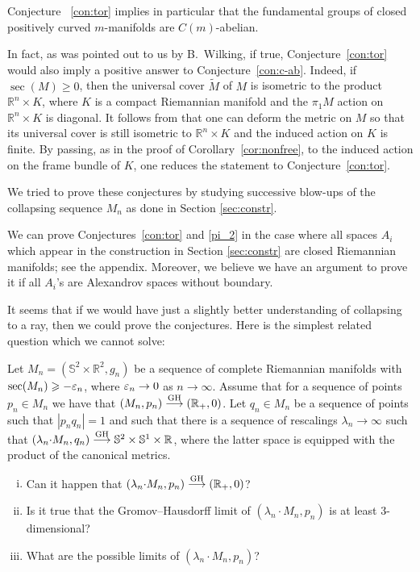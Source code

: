 \documentclass{amsart}
\begin{document}
Conjecture ~\ref{con:tor} implies in particular that the fundamental
groups of closed positively curved $m$-manifolds are $C(m)$-abelian.

In fact, as was pointed out to us by B.~Wilking, if true,
Conjecture~\ref{con:tor} would also imply a positive answer to Conjecture~\ref{con:c-ab}.
Indeed, if $\sec(M)\ge0$, then the universal cover $\tilde M$ of $M$ is isometric to the product $\mathbb{R}^n\times K$, where $K$ is a compact Riemannian manifold and the $\pi_1M$ action  on $\mathbb{R}^n\times K$ is diagonal.
It follows from \cite[Cor. 6.3]{wilking} that one can deform the metric on $M$ so that its universal cover is still isometric to $\mathbb{R}^n\times K$ and the induced action on $K$ is finite.
By passing, as in the proof of Corollary~\ref{cor:nonfree}, to the induced action on the frame bundle of $K$, one reduces the statement to Conjecture~\ref{con:tor}.

We tried to prove these conjectures by studying successive blow-ups of the
collapsing sequence $M_n$ as done in Section \ref{sec:constr}.

We can prove  Conjectures~\ref{con:tor} and \ref{pi_2} in the case where  all spaces $A_i$ which appear in the construction in  Section \ref{sec:constr} are closed Riemannian manifolds; 
see the appendix.
Moreover, we believe we have an argument to prove it if all $A_i$'s are Alexandrov spaces without boundary.

It seems that if we would have just a slightly better understanding of collapsing to a ray, then we could prove the conjectures.
Here is the simplest related question which we cannot solve:

\medskip

\begin{quest}
Let $M_n=(\mathbb{S}^2\times\mathbb{R}^2,g_n)$ be a sequence of complete Riemannian manifolds with  $\sec(M_n)\geqslant -\varepsilon_n$, where $\varepsilon_n\to0$ as $n\to\infty$.
Assume that for a sequence of points $p_n\in M_n$ we have that $(M_n,p_n)\GHto (\mathbb{R}_+,0)$.
Let $q_n\in M_n$  be a sequence of points such that $|p_n q_n|=1$ and such that there is a sequence of rescalings $\lambda_n\to\infty$ such that
$(\lambda_n{\cdot} M_n,q_n)\GHto \mathbb{S}^2\times \mathbb{S}^{1}\times \mathbb{R}$, where the latter space is equipped with the product of the canonical metrics.
\begin{enumerate}[(i)]

\item Can it happen that $(\lambda_n{\cdot} M_n,p_n)\GHto(\mathbb{R}_+,0)$?

\item Is it true that  the Gromov--Hausdorff limit of $(\lambda_n {\cdot} M_n,p_n)$
is at least 3-dimensional?

\item What are the possible limits of $(\lambda_n{\cdot}  M_n,p_n)$?

\end{enumerate}

\end{quest}
\medskip
\end{document}
